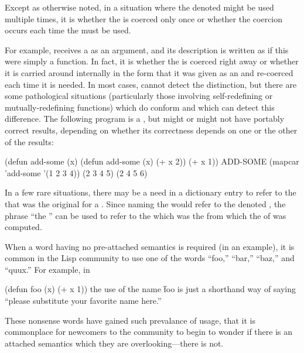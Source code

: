 Except as otherwise noted, in a situation where the denoted  
might be used multiple times, it is 
whether the  is coerced only once or whether the coercion occurs
each time the  must be used.

For example,  receives a  as an argument,
and its description is written as if this were simply a function.  In fact, it
is  whether the  is 
coerced right away or whether it is carried around internally in the form that
it was given as an  and re-coerced each time it is needed.  In most
cases,  cannot detect the distinction, but there are some 
pathological situations (particularly those involving self-redefining or 
mutually-redefining functions) which do conform and which can detect this difference.
The following program is a , but might or might not have
portably correct results, depending on whether its correctness depends on one or
the other of the results:

\code
 (defun add-some (x) 
   (defun add-some (x) (+ x 2))
   (+ x 1)) \EV ADD-SOME
 (mapcar 'add-some '(1 2 3 4))
\EV (2 3 4 5)
\OV (2 4 5 6)
\endcode

In a few rare situations, there may be a need in a dictionary entry
to refer to the  that was the original 
for a .
Since naming the  would refer to the denoted ,
the phrase ``the  '' 
can be used to refer to the  which was the 
from which the  of  was computed.

\endsubsubsection%

When a word having no pre-attached semantics is required (\eg in an
example), it is common in the Lisp community to use one of the words
``foo,'' ``bar,'' ``baz,'' and ``quux.''  For example, in

\code
 (defun foo (x) (+ x 1))
\endcode
the use of the name \f{foo} is just a shorthand way of saying 
``please substitute your favorite name here.''

These nonsense words have gained such prevalance of usage, that it is
commonplace for newcomers to the community to begin to wonder if there
is an attached semantics which they are overlooking---there is not.

